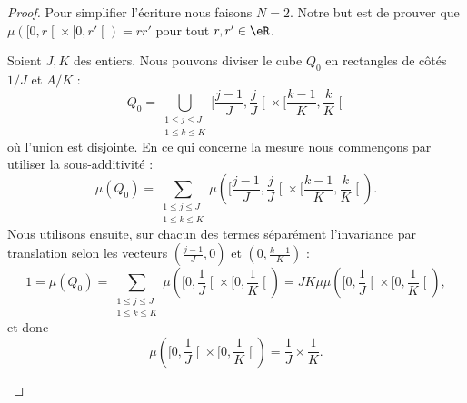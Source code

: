 \begin{proof}
	Pour simplifier l'écriture nous faisons \( N=2\). Notre but est de prouver que \( \mu(  \mathopen[ 0 , r \mathclose[\times \mathopen[ 0 , r' \mathclose[ )=rr'\) pour tout \( r,r'\in \eR\).

	\begin{subproof}
		\spitem[Longueur =\( 1/J\)]
		Soient \( J,K\) des entiers. Nous pouvons diviser le cube \( Q_0\) en rectangles de côtés \( 1/J\) et \( A/K\) :
		\begin{equation}
			Q_0=\bigcup_{\substack{1\leq j\leq J\\1\leq k\leq K}}\mathopen[ \frac{ j-1 }{ J } , \frac{ j }{ J } \mathclose[\times \mathopen[ \frac{ k-1 }{ K } , \frac{ k }{ K } \mathclose[
		\end{equation}
		où l'union est disjointe. En ce qui concerne la mesure nous commençons par utiliser la sous-additivité :
		\begin{equation}
			\mu(Q_0)=\sum_{\substack{1\leq j\leq J\\1\leq k\leq K}}\mu\left(  \mathopen[ \frac{ j-1 }{ J } , \frac{ j }{ J } \mathclose[\times \mathopen[ \frac{ k-1 }{ K } , \frac{ k }{ K } \mathclose[      \right).
		\end{equation}
		Nous utilisons ensuite, sur chacun des termes séparément l'invariance par translation selon les vecteurs \( (\frac{ j-1 }{ J },0)\) et \( ( 0,\frac{ k-1 }{ K } )\) :
		\begin{equation}
			1=\mu(Q_0)=\sum_{\substack{1\leq j\leq J\\1\leq k\leq K}}\mu\left(  \mathopen[ 0,\frac{1}{ J } \mathclose[\times \mathopen[0,\frac{1}{ K }\mathclose[      \right)=JK\mu\mu\left(  \mathopen[ 0,\frac{1}{ J } \mathclose[\times \mathopen[0,\frac{1}{ K }\mathclose[      \right),
		\end{equation}
		et donc
		\begin{equation}
			\mu\left(  \mathopen[ 0,\frac{1}{ J } \mathclose[\times \mathopen[0,\frac{1}{ K }\mathclose[      \right)=\frac{1}{ J }\times \frac{1}{ K }.
		\end{equation}
		\spitem[Longueur \( L/K\)]


\end{subproof}
\end{proof}
